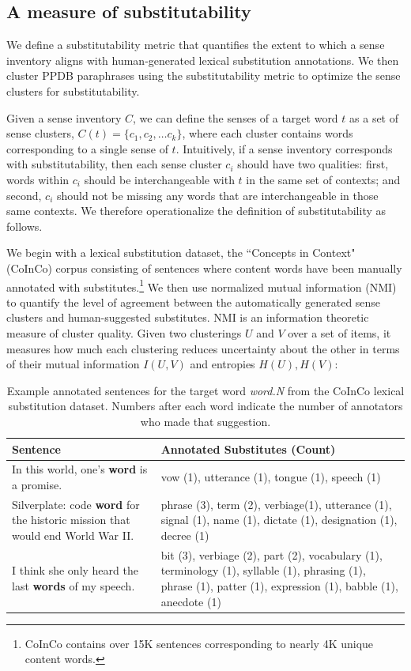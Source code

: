 \documentclass[11pt]{article}
\begin{document}
\subsection{A measure of substitutability}
\label{nmi} 

We define a substitutability metric that quantifies the extent to which a sense inventory aligns with human-generated lexical substitution annotations. We then cluster PPDB paraphrases using the substitutability metric to optimize the sense clusters for substitutability. 

Given a sense inventory $C$, we can define the senses of a target word $t$ as a set of sense clusters, $C(t) = \{c_1, c_2, \dots c_k\}$, where each cluster contains words corresponding to a single sense of $t$. Intuitively, if a sense inventory corresponds with substitutability, then each sense cluster $c_i$ should have two qualities: first, words within $c_i$ should be interchangeable with $t$ in the same set of contexts; and second, $c_i$ should not be missing any words that are interchangeable in those same contexts. We therefore operationalize the definition of substitutability as follows. 

We begin with a 
lexical substitution dataset, the ``Concepts in Context" (CoInCo) corpus \cite{kremer-EtAl:2014:EACL} consisting of sentences where content words have been manually annotated with substitutes.\footnote{CoInCo contains over 15K sentences corresponding to nearly 4K unique content words.} 
We then use normalized mutual information (NMI) \cite{strehl2002cluster} to quantify the level of agreement between the automatically generated sense clusters and human-suggested substitutes. NMI is an information theoretic measure of cluster quality. Given two clusterings $U$ and $V$ over a set of items, it measures how much each clustering reduces uncertainty about the other \cite{vinh2009information} in terms of their mutual information $I(U,V)$ and entropies $H(U), H(V)$:

\begin{table}[t]
	\small
	\begin{tabular}{p{} p{}}
		\hline
		Sentence & Annotated Substitutes (Count) \\ \hline \hline
		In this world, one's \textbf{word} is a promise. & vow (1), utterance (1), tongue (1), speech (1) \\ \hline
		Silverplate: code \textbf{word} for the historic mission that would end World War II. & phrase (3), term (2), verbiage(1), utterance (1), signal (1), name (1), dictate (1), designation (1), decree (1) \\ \hline
		I think she only heard the last \textbf{words} of my speech. & bit (3), verbiage (2), part (2), vocabulary (1), terminology (1), syllable (1), phrasing (1), phrase (1), patter (1), expression (1), babble (1), anecdote (1) \\
	\end{tabular}
	\caption{Example annotated sentences for the target word \textit{word.N} from the CoInCo lexical substitution dataset. Numbers after each word indicate the number of annotators who made that suggestion.}
	\label{tab:lexsub}
\end{table}
\end{document}
